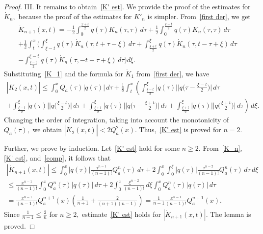 \documentclass[a4paper, 12pt] {article}
\theoremstyle{plain}
\theoremstyle{remark}
\theoremstyle{plain}
\theoremstyle{definition}
\numberwithin{equation}{section}
\begin{document}
\begin{proof}
III. It remains to obtain~\eqref{K' est}. We provide the proof of the estimates for $\dot K_n,$ because the proof of the estimates for $ K'_n$ is simpler. From~\eqref{first der}, we get
\begin{equation} \label{comp} 
\begin{split}
\dot K_{n+1}(x, t) = -\frac{1}{2} \int_0^{\frac{x+t}{2}} q(\tau) K_n(\tau, \tau) \,d\tau +\frac{1}{2} \int_0^{\frac{x-t}{2}} q(\tau) K_n(\tau, \tau) \,d\tau \\
+\frac12\int_t^x \Bigg(\int_{\xi-t}^\xi q(\tau)\dot K_n(\tau, t+\tau-\xi)\,d\tau +
\int_{\frac{\xi+t}{2}}^\xi q(\tau)\dot K_n(\tau, t-\tau+\xi)\,d\tau \\
-\int_{\frac{\xi-t}{2}}^{\xi-t} q(\tau)\dot K_n(\tau, -t+\tau+\xi)\,d\tau\Bigg)d\xi.
\end{split}
\end{equation}
Substituting~\eqref{K_1} and the formula for $\dot{K}_1$ from~\eqref{first der}, we have
\begin{equation*}
\begin{split}
|\dot K_2(x, t)| \le \int_0^x Q_a(\tau) |q(\tau)|\, d\tau
+ \frac18 \int_t^x \left(\int_{\frac{\xi-t}{2}}^\xi |q(\tau)| \Big|q\Big(\tau - \frac{\xi-t}{2}\Big)\Big|\,d\tau \right.\\
\left.+\int_{\frac{\xi-t}{2}}^\xi |q(\tau)| \Big|q\Big(\frac{\xi-t}{2}\Big)\Big|\,d\tau
+\int_{\frac{\xi+t}{2}}^\xi |q(\tau)| \Big|q\Big(\tau - \frac{\xi+t}{2}\Big)\Big|\,d\tau
+\int_{\frac{\xi+t}{2}}^\xi |q(\tau)| \Big|q\Big(\frac{\xi+t}{2}\Big)\Big|\,d\tau\right)\,d\xi.
\end{split}
\end{equation*}
Changing the order of integration, taking into account the monotonicity of $Q_a(\tau),$ we obtain
$|\dot K_2(x, t)| < 2 Q^2_a(x).$ Thus,~\eqref{K' est} is proved for $n=2.$

Further, we prove by induction. Let~\eqref{K' est} hold for some $n \ge 2.$ From~\eqref{K_n}, \eqref{K' est}, and~\eqref{comp}, it follows that
\begin{equation*}
\begin{split}
|\dot{K}_{n+1}(x,t)| \le \int_0^x |q(\tau)| \frac{\tau^{n-1}}{(n-1)!} Q_a^n(\tau) \,d\tau + 2\int_0^x \int_0^\xi |q(\tau)| \frac{\tau^{n-2}}{(n-1)!} Q_a^n(\tau)\,d\tau\,d\xi \\
\le\frac{x^{n-1}}{(n-1)!} \int_0^x Q^n_a(\tau) |q(\tau)|\, d\tau + 2\int_0^x \frac{\xi^{n-2}}{(n-1)!} \,d\xi \int_0^x Q^n_a(\tau) |q(\tau)|\, d\tau\\
= \frac{x^{n-1}}{(n-1)!} Q_a^{n+1}(x) \left( \frac{1}{n+1} + \frac{2}{(n+1)(n-1)}\right) = \frac{1}{n-1}\frac{x^{n-1}}{(n-1)!} Q_a^{n+1}(x).
\end{split}
\end{equation*}
Since $\frac{1}{n-1} \le \frac2n$ for $n \ge 2,$ estimate~\eqref{K' est} holds for $|\dot{K}_{n+1}(x,t)|.$ The lemma is proved.
\end{proof}
\end{document}

